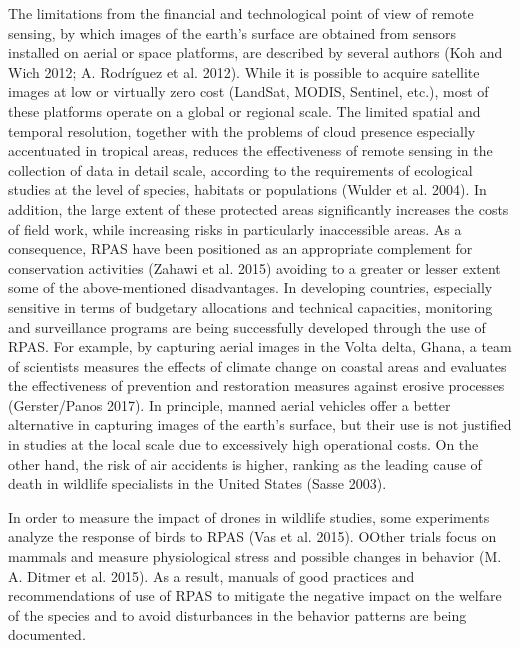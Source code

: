\documentclass[]{interact}
\theoremstyle{plain}%
\theoremstyle{definition}
\theoremstyle{remark}
\begin{document}
The limitations from the financial and technological point of view of
remote sensing, by which images of the earth's surface are obtained from
sensors installed on aerial or space platforms, are described by several
authors (Koh and Wich 2012; A. Rodríguez et al. 2012). While it is
possible to acquire satellite images at low or virtually zero cost
(LandSat, MODIS, Sentinel, etc.), most of these platforms operate on a
global or regional scale. The limited spatial and temporal resolution,
together with the problems of cloud presence especially accentuated in
tropical areas, reduces the effectiveness of remote sensing in the
collection of data in detail scale, according to the requirements of
ecological studies at the level of species, habitats or populations
(Wulder et al. 2004). In addition, the large extent of these protected
areas significantly increases the costs of field work, while increasing
risks in particularly inaccessible areas. As a consequence, RPAS have
been positioned as an appropriate complement for conservation activities
(Zahawi et al. 2015) avoiding to a greater or lesser extent some of the
above-mentioned disadvantages. In developing countries, especially
sensitive in terms of budgetary allocations and technical capacities,
monitoring and surveillance programs are being successfully developed
through the use of RPAS. For example, by capturing aerial images in the
Volta delta, Ghana, a team of scientists measures the effects of climate
change on coastal areas and evaluates the effectiveness of prevention
and restoration measures against erosive processes (Gerster/Panos 2017).
In principle, manned aerial vehicles offer a better alternative in
capturing images of the earth's surface, but their use is not justified
in studies at the local scale due to excessively high operational costs.
On the other hand, the risk of air accidents is higher, ranking as the
leading cause of death in wildlife specialists in the United States
(Sasse 2003).

In order to measure the impact of drones in wildlife studies, some
experiments analyze the response of birds to RPAS (Vas et al. 2015).
OOther trials focus on mammals and measure physiological stress and
possible changes in behavior (M. A. Ditmer et al. 2015). As a result,
manuals of good practices and recommendations of use of RPAS to mitigate
the negative impact on the welfare of the species and to avoid
disturbances in the behavior patterns are being documented.
\end{document}
